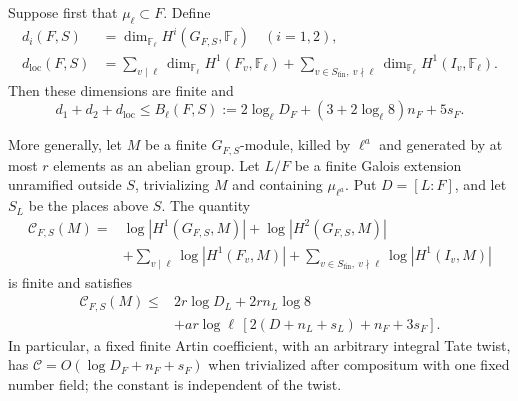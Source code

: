 \begin{theorem}
\label{AC-K19}
Suppose first that $\mu_\ell\subset F$.  Define
\[
 \begin{split}
 d_i(F,S)&=\dim_{\mathbb F_\ell}H^i(G_{F,S},\mathbb F_\ell)
                  \quad(i=1,2),\\
 d_{\mathrm{loc}}(F,S)&=
 \sum_{v\mid\ell}\dim_{\mathbb F_\ell}H^1(F_v,\mathbb F_\ell)
 +\sum_{v\in S_{\mathrm{fin}},\ v\nmid\ell}
                \dim_{\mathbb F_\ell}H^1(I_v,\mathbb F_\ell).
 \end{split}
\]
Then these dimensions are finite and
\[
 d_1+d_2+d_{\mathrm{loc}}
 \leq B_\ell(F,S):=
 2\log_\ell D_F+(3+2\log_\ell8)n_F+5s_F.       \tag{FG.1}
\]

More generally, let $M$ be a finite $G_{F,S}$-module,
killed by $\ell^a$ and generated by at most $r$ elements
as an abelian group.  Let $L/F$ be a finite Galois extension
unramified outside $S$, trivializing $M$ and containing
$\mu_{\ell^a}$.  Put $D=[L:F]$, and let $S_L$ be the
places above $S$.  The quantity
\[
 \begin{split}
 \mathcal C_{F,S}(M)={}&\log|H^1(G_{F,S},M)|
      +\log|H^2(G_{F,S},M)|\\
 &+\sum_{v\mid\ell}\log|H^1(F_v,M)|
      +\sum_{v\in S_{\mathrm{fin}},\ v\nmid\ell}
                         \log|H^1(I_v,M)|
 \end{split}
\]
is finite and satisfies
\[
 \begin{split}
 \mathcal C_{F,S}(M)\leq{}&2r\log D_L+2rn_L\log8\\
 &+ar\log\ell\,[2(D+n_L+s_L)+n_F+3s_F].
 \end{split}
 \tag{FG.2}
\]
In particular, a fixed finite Artin coefficient, with an
arbitrary integral Tate twist, has
$\mathcal C=O(\log D_F+n_F+s_F)$ when trivialized after
compositum with one fixed number field; the constant is
independent of the twist.


\end{theorem}
